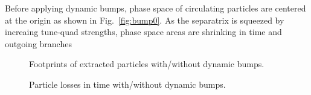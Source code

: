 \documentclass[aps,prstab,onecolumn,preprint,nofootinbib]{revtex4-1}
\begin{document}
Before applying dynamic bumps, phase space of circulating particles are centered at the origin as shown in Fig.~\ref{fig:bump0}. As the separatrix is squeezed by increaing tune-quad strengths, phase space areas are shrinking in time and outgoing branches 


\begin{figure}[tbh!]
  \begin{center}
    \caption{\label{fig:bump4}Footprints of extracted particles with/without dynamic bumps.}
  \end{center}
\end{figure}

\begin{figure}[tbh!]
  \begin{center}
    \caption{\label{fig:bump5}Particle losses in time with/without dynamic bumps.}
  \end{center}
\end{figure}
\end{document}
